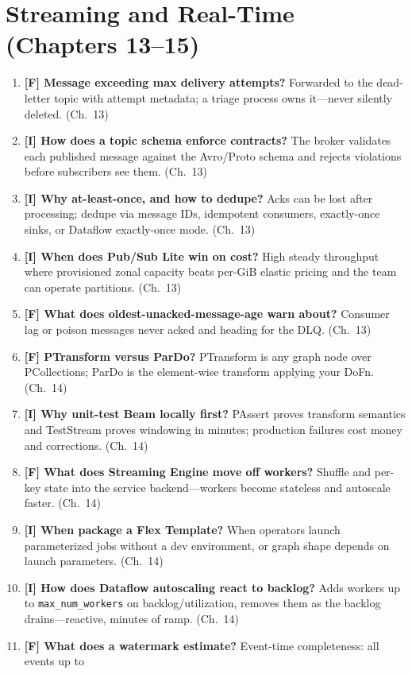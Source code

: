 \section{Streaming and Real-Time (Chapters 13--15)}
\begin{enumerate}
    \item \textbf{[F] Message exceeding max delivery attempts?} Forwarded to the dead-letter topic
    with attempt metadata; a triage process owns it---never silently deleted. (Ch.~13)
    \item \textbf{[I] How does a topic schema enforce contracts?} The broker validates each
    published message against the Avro/Proto schema and rejects violations before subscribers see
    them. (Ch.~13)
    \item \textbf{[I] Why at-least-once, and how to dedupe?} Acks can be lost after processing;
    dedupe via message IDs, idempotent consumers, exactly-once sinks, or Dataflow exactly-once
    mode. (Ch.~13)
    \item \textbf{[I] When does Pub/Sub Lite win on cost?} High steady throughput where
    provisioned zonal capacity beats per-GiB elastic pricing and the team can operate partitions.
    (Ch.~13)
    \item \textbf{[F] What does oldest-unacked-message-age warn about?} Consumer lag or poison
    messages never acked and heading for the DLQ. (Ch.~13)
    \item \textbf{[F] PTransform versus ParDo?} PTransform is any graph node over PCollections;
    ParDo is the element-wise transform applying your DoFn. (Ch.~14)
    \item \textbf{[I] Why unit-test Beam locally first?} PAssert proves transform semantics and
    TestStream proves windowing in minutes; production failures cost money and corrections.
    (Ch.~14)
    \item \textbf{[F] What does Streaming Engine move off workers?} Shuffle and per-key state into
    the service backend---workers become stateless and autoscale faster. (Ch.~14)
    \item \textbf{[I] When package a Flex Template?} When operators launch parameterized jobs
    without a dev environment, or graph shape depends on launch parameters. (Ch.~14)
    \item \textbf{[I] How does Dataflow autoscaling react to backlog?} Adds workers up to
    \texttt{max\_num\_workers} on backlog/utilization, removes them as the backlog
    drains---reactive, minutes of ramp. (Ch.~14)
    \item \textbf{[F] What does a watermark estimate?} Event-time completeness: all events up to

\end{enumerate}
